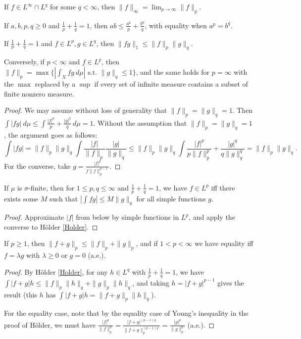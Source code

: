 \documentclass[letterpaper,11pt]{report}
\begin{document}
\begin{prop} If $f \in L^\infty \cap L^q$ for some $q < \infty$, then $\|f\|_\infty = \lim_{p \rightarrow \infty} \|f\|_p$.
\end{prop}

\begin{lem} If $a,b,p,q \ge 0$ and $\frac{1}{p} + \frac{1}{q} = 1$, then $ab \le \frac{a^p}{p} + \frac{b^q}{q}$, with equality when $a^p = b^q$.
\end{lem}

\begin{thm}[H\"older]\label{Holder} If $\frac{1}{p} + \frac{1}{q} = 1$ and $f \in L^p, g \in L^q$, then $\|fg\|_1 \le \|f\|_p \|g\|_q$.

Conversely, if $p < \infty$ and $f \in L^p$, then $\|f\|_p = \max\{|\int_X fg\ d\mu| \text{ s.t. } \|g\|_q \le 1\}$, and the same holds for $p = \infty$ with the $\max$ replaced by a $\sup$ if every set of infinite measure contains a subset of finite nonzero measure.
\end{thm}
\begin{proof} We may assume without loss of generality that $\|f\|_p = \|g\|_q = 1$. Then $\int |fg|\ d\mu \le \int \frac{|f|^p}{p} + \frac{|g|^q}{q}\ d\mu = 1$. Without the assumption that $\|f\|_p = \|g\|_q = 1$, the argument goes as follows:
\[
\int |fg| = \|f\|_p\|g\|_q\int \frac{|f|}{\|f\|_p}\frac{|g|}{\|g\|_q} \le \|f\|_p\|g\|_q \int \frac{|f|^p}{p\|f\|_p^p} + \frac{|g|^q}{q\|g\|_q^q} = \|f\|_p\|g\|_q.
\]
For the converse, take $g = \frac{|f|^p}{f\|f\|_p^{p-1}}$.
\end{proof}

\begin{cor} If $\mu$ is $\sigma$-finite, then for $1 \le p,q \le \infty$ and $\frac{1}{p} + \frac{1}{q} = 1$, we have $f \in L^p$ iff there exists some $M$ such that $|\int fg| \le M\|g\|_q$ for all simple functions $g$.
\end{cor}
\begin{proof} Approximate $|f|$ from below by simple functions in $L^p$, and apply the converse to H\"older \ref{Holder}.
\end{proof}

\begin{thm}[Minkowski]\label{Minkowski} If $p \ge 1$, then $\|f+g\|_p \le \|f\|_p + \|g\|_p$, and if $1 < p < \infty$ we have equality iff $f = \lambda g$ with $\lambda \ge 0$ or $g = 0$ (a.e.).
\end{thm}
\begin{proof} By H\"older \ref{Holder}, for any $h \in L^q$ with $\frac{1}{p} + \frac{1}{q} = 1$, we have $\int |f+g|h \le \|f\|_p\|h\|_q + \|g\|_p\|h\|_q$, and taking $h = |f+g|^{p-1}$ gives the result (this $h$ has $\int |f+g|h = \|f+g\|_p\|h\|_q$).

For the equality case, note that by the equality case of Young's inequality in the proof of H\"older, we must have $\frac{|f|^p}{\|f\|_p^p} = \frac{|f+g|^{(p-1)q}}{\|f+g\|_p^{(p-1)q}} = \frac{|g|^p}{\|g\|_p^p}$ (a.e.).
\end{proof}
\end{document}
